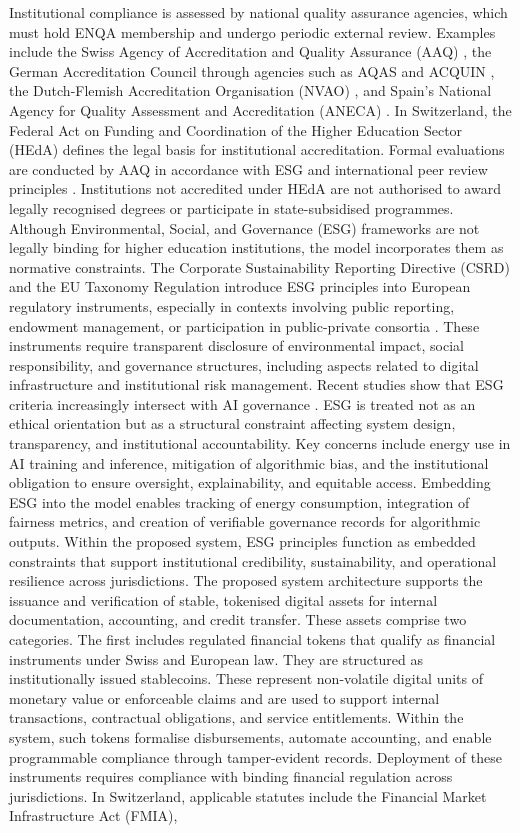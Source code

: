 \documentclass[oneside,10pt]{swissi}
\begin{document}
Institutional compliance is assessed by national quality assurance agencies, which must hold ENQA membership and undergo periodic external review. Examples include the Swiss Agency of Accreditation and Quality Assurance (AAQ) \cite{aaq2024}, the German Accreditation Council through agencies such as AQAS and ACQUIN \cite{germanaccreditation2022}, the Dutch-Flemish Accreditation Organisation (NVAO) \cite{nvao2023}, and Spain’s National Agency for Quality Assessment and Accreditation (ANECA) \cite{aneca2023}. In Switzerland, the Federal Act on Funding and Coordination of the Higher Education Sector (HEdA) defines the legal basis for institutional accreditation. Formal evaluations are conducted by AAQ in accordance with ESG and international peer review principles \cite{heda2020}. Institutions not accredited under HEdA are not authorised to award legally recognised degrees or participate in state-subsidised programmes. Although Environmental, Social, and Governance (ESG) frameworks are not legally binding for higher education institutions, the model incorporates them as normative constraints. The Corporate Sustainability Reporting Directive (CSRD) and the EU Taxonomy Regulation introduce ESG principles into European regulatory instruments, especially in contexts involving public reporting, endowment management, or participation in public-private consortia \cite{eu2023csrd, eu2020taxonomy}. These instruments require transparent disclosure of environmental impact, social responsibility, and governance structures, including aspects related to digital infrastructure and institutional risk management. Recent studies show that ESG criteria increasingly intersect with AI governance \cite{lee2024esgai, perera2024esgrai}. ESG is treated not as an ethical orientation but as a structural constraint affecting system design, transparency, and institutional accountability. Key concerns include energy use in AI training and inference, mitigation of algorithmic bias, and the institutional obligation to ensure oversight, explainability, and equitable access. Embedding ESG into the model enables tracking of energy consumption, integration of fairness metrics, and creation of verifiable governance records for algorithmic outputs. Within the proposed system, ESG principles function as embedded constraints that support institutional credibility, sustainability, and operational resilience across jurisdictions. The proposed system architecture supports the issuance and verification of stable, tokenised digital assets for internal documentation, accounting, and credit transfer. These assets comprise two categories. The first includes regulated financial tokens that qualify as financial instruments under Swiss and European law. They are structured as institutionally issued stablecoins. These represent non-volatile digital units of monetary value or enforceable claims and are used to support internal transactions, contractual obligations, and service entitlements. Within the system, such tokens formalise disbursements, automate accounting, and enable programmable compliance through tamper-evident records. Deployment of these instruments requires compliance with binding financial regulation across jurisdictions. In Switzerland, applicable statutes include the Financial Market Infrastructure Act (FMIA), 
\end{document}
